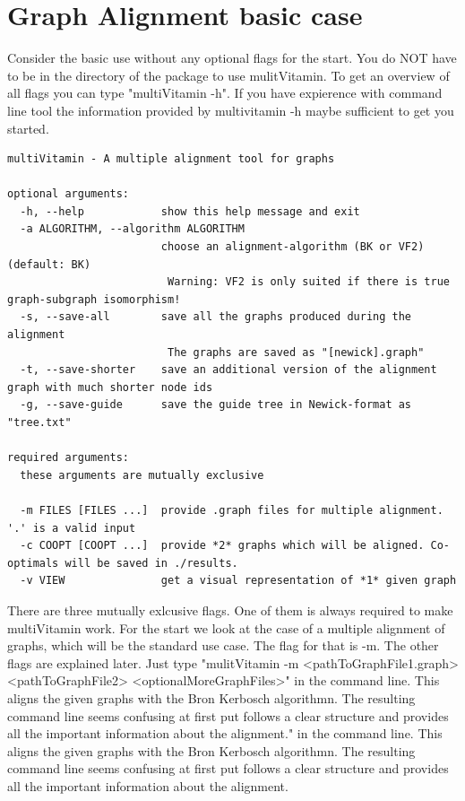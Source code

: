 \documentclass{SeminarV2}
\begin{document}
\section{Graph Alignment basic case}
Consider the basic use without any optional flags for the start.
You do NOT have to be in the directory of the package to use mulitVitamin.
To get an overview of all flags you can type "multiVitamin -h".
If you have expierence with command line tool the information provided by multivitamin -h
maybe sufficient to get you started.\\
\begin{verbatim}
multiVitamin - A multiple alignment tool for graphs

optional arguments:
  -h, --help            show this help message and exit
  -a ALGORITHM, --algorithm ALGORITHM
                        choose an alignment-algorithm (BK or VF2) (default: BK)
                         Warning: VF2 is only suited if there is true graph-subgraph isomorphism!
  -s, --save-all        save all the graphs produced during the alignment
                         The graphs are saved as "[newick].graph"
  -t, --save-shorter    save an additional version of the alignment graph with much shorter node ids
  -g, --save-guide      save the guide tree in Newick-format as "tree.txt"

required arguments:
  these arguments are mutually exclusive

  -m FILES [FILES ...]  provide .graph files for multiple alignment. '.' is a valid input
  -c COOPT [COOPT ...]  provide *2* graphs which will be aligned. Co-optimals will be saved in ./results.
  -v VIEW               get a visual representation of *1* given graph
\end{verbatim}
There are three mutually exlcusive flags. One of them is always
required to make multiVitamin work. For the start we look at the
case of a multiple alignment of graphs, which will be the standard use case.
The flag for that is -m. The other flags are explained later.
Just type "mulitVitamin -m <pathToGraphFile1.graph> <pathToGraphFile2> <optionalMoreGraphFiles>"
in the command line. This aligns the given graphs with the Bron Kerbosch algorithmn.
The resulting command line seems confusing at first put follows a clear structure
and provides all the important information about the alignment."
in the command line. This aligns the given graphs with the Bron Kerbosch algorithmn.
The resulting command line seems confusing at first put follows a clear structure
and provides all the important information about the alignment.
\end{document}
